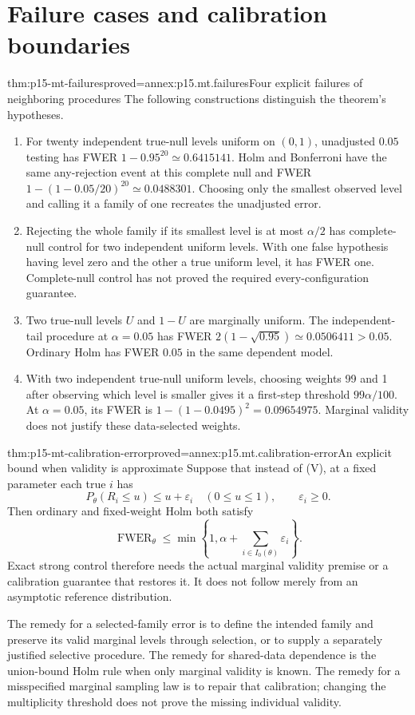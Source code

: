 \section{Failure cases and calibration boundaries}
\label{sec:p15-mt-failures}

\begin{hbtheorem}{thm:p15-mt-failures}{proved=annex:p15.mt.failures}{Four explicit failures of neighboring procedures}
The following constructions distinguish the theorem's hypotheses.
\begin{enumerate}
\item For twenty independent true-null levels uniform on \((0,1)\),
unadjusted \(0.05\) testing has FWER
\(1-0.95^{20}\simeq0.6415141\).
Holm and Bonferroni have the same any-rejection event at this complete
null and FWER \(1-(1-0.05/20)^{20}\simeq0.0488301\).
Choosing only the smallest observed level and calling it a family of one
recreates the unadjusted error.
\item Rejecting the whole family if its smallest level is at most
\(\alpha/2\) has complete-null control for two independent uniform levels.
With one false hypothesis having level zero and the other a true
uniform level, it has FWER one. Complete-null control has not proved
the required every-configuration guarantee.
\item Two true-null levels \(U\) and \(1-U\) are marginally uniform.
The independent-tail procedure at \(\alpha=0.05\) has FWER
\(2(1-\sqrt{0.95})\simeq0.0506411>0.05\).
Ordinary Holm has FWER \(0.05\) in the same dependent model.
\item With two independent true-null uniform levels, choosing weights
99 and 1 after observing which level is smaller gives it a first-step
threshold \(99\alpha/100\). At \(\alpha=0.05\), its FWER is
\(1-(1-0.0495)^2=0.09654975\).
Marginal validity does not justify these data-selected weights.
\end{enumerate}
\end{hbtheorem}

\begin{hblemma}{thm:p15-mt-calibration-error}{proved=annex:p15.mt.calibration-error}{An explicit bound when validity is approximate}
Suppose that instead of (V), at a fixed parameter each true \(i\) has
\[
 P_\theta(R_i\leq u)\leq u+\varepsilon_i\quad(0\leq u\leq1),
 \qquad \varepsilon_i\geq0.
\]
Then ordinary and fixed-weight Holm both satisfy
\[
 \operatorname{FWER}_\theta
       \leq\min\left\{1,\alpha+\sum_{i\in I_0(\theta)}\varepsilon_i\right\}.
\]
Exact strong control therefore needs the actual marginal validity premise
or a calibration guarantee that restores it. It does not follow merely
from an asymptotic reference distribution.
\end{hblemma}

The remedy for a selected-family error is to define the intended family
and preserve its valid marginal levels through selection, or to supply
a separately justified selective procedure. The remedy for shared-data
dependence is the union-bound Holm rule when only marginal validity is
known. The remedy for a misspecified marginal sampling law is to repair
that calibration; changing the multiplicity threshold does not prove
the missing individual validity.
